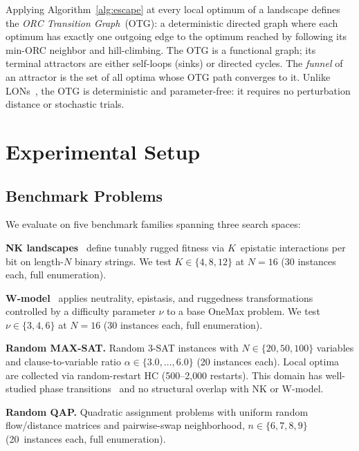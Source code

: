 \documentclass[runningheads]{llncs}
\begin{document}
Applying Algorithm~\ref{alg:escape} at every local optimum of a landscape defines the \emph{ORC Transition Graph}~(OTG): a deterministic directed graph where each optimum has exactly one outgoing edge to the optimum reached by following its min-ORC neighbor and hill-climbing.
The OTG is a functional graph; its terminal attractors are either self-loops (sinks) or directed cycles.
The \emph{funnel} of an attractor is the set of all optima whose OTG path converges to it.
Unlike LONs~\cite{tomassini2022lon}, the OTG is deterministic and parameter-free: it requires no perturbation distance or stochastic trials.


\section{Experimental Setup}
\label{sec:setup}

\subsection{Benchmark Problems}
\label{sec:benchmarks}

We evaluate on five benchmark families spanning three search spaces:

\textbf{NK landscapes}~\cite{kauffman1993origins} define tunably rugged fitness via $K$~epistatic interactions per bit on length-$N$ binary strings.
We test $K \in \{4, 8, 12\}$ at $N\!=\!16$ (30 instances each, full enumeration).

\textbf{W-model}~\cite{weise2018wmodel} applies neutrality, epistasis, and ruggedness transformations controlled by a difficulty parameter $\nu$ to a base OneMax problem.
We test $\nu \in \{3, 4, 6\}$ at $N\!=\!16$ (30 instances each, full enumeration).

\textbf{Random MAX-SAT.}
Random 3-SAT instances with $N \in \{20, 50, 100\}$ variables and clause-to-variable ratio $\alpha \in \{3.0, \ldots, 6.0\}$ (20 instances each).
Local optima are collected via random-restart HC (500--2{,}000 restarts).
This domain has well-studied phase transitions~\cite{ochoa2020maxsat} and no structural overlap with NK or W-model.

\textbf{Random QAP.}
Quadratic assignment problems with uniform random flow\slash distance matrices and pairwise-swap neighborhood, $n \in \{6, 7, 8, 9\}$ (20~instances each, full enumeration).
\end{document}
